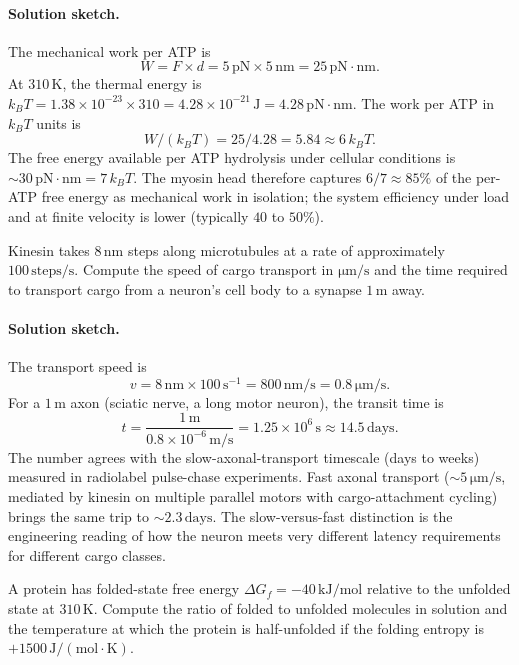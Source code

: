 \paragraph{Solution sketch.}
The mechanical work per ATP is
\[
W = F \times d = 5\,\text{pN} \times 5\,\text{nm}
= 25\,\text{pN}\cdot\text{nm}.
\]
At $310\,\si{\kelvin}$, the thermal energy is $k_B T = 1.38 \times
10^{-23} \times 310 = 4.28 \times 10^{-21}\,\text{J} =
4.28\,\text{pN}\cdot\text{nm}$. The work per ATP in $k_B T$ units is
\[
W / (k_B T) = 25 / 4.28 = 5.84 \approx 6\,k_B T.
\]
The free energy available per ATP hydrolysis under cellular
conditions is $\sim 30\,\text{pN}\cdot\text{nm} = 7\,k_B T$. The
myosin head therefore captures $6/7 \approx 85\%$ of the per-ATP
free energy as mechanical work in isolation; the system efficiency
under load and at finite velocity is lower (typically $40$ to $50\%$).

\begin{exercise}
Kinesin takes $8\,\text{nm}$ steps along microtubules at a rate of
approximately $100\,\text{steps}/\text{s}$. Compute the speed of
cargo transport in $\si{\micro\meter}/\text{s}$ and the time required
to transport cargo from a neuron's cell body to a synapse $1\,\text{m}$
away.
\end{exercise}

\paragraph{Solution sketch.}
The transport speed is
\[
v = 8\,\text{nm} \times 100\,\text{s}^{-1}
= 800\,\text{nm/s} = 0.8\,\si{\micro\meter}/\text{s}.
\]
For a $1\,\text{m}$ axon (sciatic nerve, a long motor neuron), the
transit time is
\[
t = \frac{1\,\text{m}}{0.8 \times 10^{-6}\,\text{m/s}}
= 1.25 \times 10^{6}\,\text{s} \approx 14.5\,\text{days}.
\]
The number agrees with the slow-axonal-transport timescale (days to
weeks) measured in radiolabel pulse-chase experiments. Fast axonal
transport ($\sim 5\,\si{\micro\meter}/\text{s}$, mediated by kinesin
on multiple parallel motors with cargo-attachment cycling) brings
the same trip to $\sim 2.3\,\text{days}$. The slow-versus-fast
distinction is the engineering reading of how the neuron meets very
different latency requirements for different cargo classes.

\begin{exercise}
A protein has folded-state free energy $\Delta G_f = -40\,\text{kJ}/\text{mol}$
relative to the unfolded state at $310\,\si{\kelvin}$. Compute the
ratio of folded to unfolded molecules in solution and the temperature
at which the protein is half-unfolded if the folding entropy is
$+1500\,\text{J}/(\text{mol}\cdot\si{\kelvin})$.
\end{exercise}

